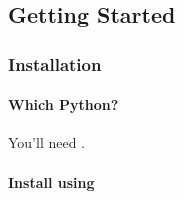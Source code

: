 \documentclass[letterpaper,10pt,english,openany,oneside]{sphinxmanual}
\begin{document}
\sphinxstepscope


\subsection{Getting Started}
\label{\detokenize{getting_started/index:getting-started}}\label{\detokenize{getting_started/index::doc}}
\sphinxstepscope


\subsubsection{Installation}
\label{\detokenize{getting_started/installation:installation}}\label{\detokenize{getting_started/installation::doc}}

\paragraph{Which Python?}
\label{\detokenize{getting_started/installation:which-python}}\label{\detokenize{getting_started/installation:id1}}
\sphinxAtStartPar
You’ll need .


\paragraph{Install using }
\label{\detokenize{getting_started/installation:install-using-pip}}
\sphinxAtStartPar
{}
\end{document}
